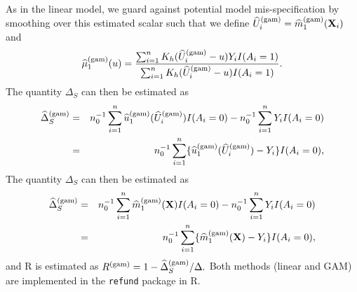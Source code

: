 \documentclass[useAMS,usenatbib,referee]{biom}
\begin{document}
As in the linear model, we guard against potential model mis-specification by smoothing over this estimated scalar such that we define $\widehat U^{(\text{gam})}_i = \widehat{m}_1^{(\text{gam})}({\bf X}_i)$ and $$\widehat \mu_1^{(\text{gam})} (u) = \frac{\sum_{i=1}^n K_h(\widehat U^{(\text{gam})}_i - u) Y_i I(A_i = 1)}{\sum_{i=1}^n K_h(\widehat U^{(\text{gam})}_i - u)  I(A_i = 1)}.$$
The quantity $\Delta_S$ can then be estimated as \begin{eqnarray*}
\widehat \Delta_S^{(\text{gam})} &=& n_0^{-1} \sum_{i=1}^n \widehat{u}_1^{(\text{gam})}(\widehat{U}^{(\text{gam})}_i) I(A_i = 0) - n_0^{-1}\sum_{i=1}^n Y_i I(A_i = 0) \\
&=& n_0^{-1} \sum_{i=1}^n \{ \widehat{u}_1^{(\text{gam})}(\widehat{U}^{(\text{gam})}_i) - Y_i\}I(A_i = 0),
\end{eqnarray*}
The quantity $\Delta_S$ can then be estimated as \begin{eqnarray*}
\widehat \Delta_S^{(\text{gam})} &=& n_0^{-1} \sum_{i=1}^n \widehat{m}_1^{(\text{gam})}({\bf X}) I(A_i = 0) - n_0^{-1}\sum_{i=1}^n Y_i I(A_i = 0) \\
&=& n_0^{-1} \sum_{i=1}^n \{ \widehat{m}_1^{(\text{gam})}({\bf X}) - Y_i\}I(A_i = 0),
\end{eqnarray*}
and R is estimated as $R^{(\text{gam})} = 1-\widehat \Delta_S^{(\text{gam})} / \Delta.$ Both methods (linear and GAM) are implemented in the \texttt{refund} package in R. 
\end{document}
